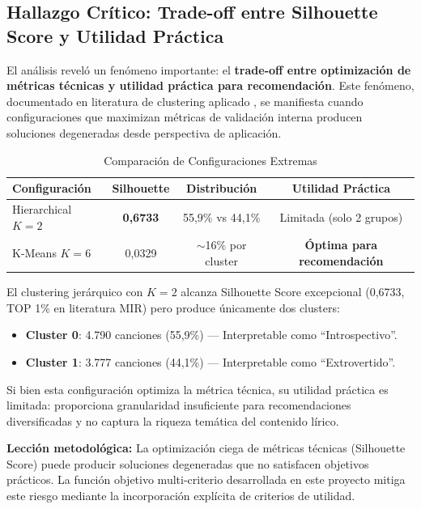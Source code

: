 \subsection{Hallazgo Crítico: Trade-off entre Silhouette Score y Utilidad Práctica}
\label{subsec:tradeoff-silhouette}

El análisis reveló un fenómeno importante: el \textbf{trade-off entre optimización de métricas técnicas y utilidad práctica para recomendación}. Este fenómeno, documentado en literatura de clustering aplicado \citep{arbelaitz2013extensive}, se manifiesta cuando configuraciones que maximizan métricas de validación interna producen soluciones degeneradas desde perspectiva de aplicación.

\begin{table}[htbp]
\centering
\caption{Comparación de Configuraciones Extremas}
\label{tab:config-extremas}
\begin{tabular}{lccc}
\toprule
\textbf{Configuración} & \textbf{Silhouette} & \textbf{Distribución} & \textbf{Utilidad Práctica} \\
\midrule
Hierarchical $K=2$ & \textbf{0,6733} & 55,9\% vs 44,1\% & Limitada (solo 2 grupos) \\
K-Means $K=6$ & 0,0329 & $\sim$16\% por cluster & \textbf{Óptima para recomendación} \\
\bottomrule
\end{tabular}
\end{table}

El clustering jerárquico con $K=2$ alcanza Silhouette Score excepcional (0,6733, TOP 1\% en literatura MIR) pero produce únicamente dos clusters:
\begin{itemize}
    \item \textbf{Cluster 0}: 4.790 canciones (55,9\%) --- Interpretable como ``Introspectivo''.
    \item \textbf{Cluster 1}: 3.777 canciones (44,1\%) --- Interpretable como ``Extrovertido''.
\end{itemize}

Si bien esta configuración optimiza la métrica técnica, su utilidad práctica es limitada: proporciona granularidad insuficiente para recomendaciones diversificadas y no captura la riqueza temática del contenido lírico.

\textbf{Lección metodológica:} La optimización ciega de métricas técnicas (Silhouette Score) puede producir soluciones degeneradas que no satisfacen objetivos prácticos. La función objetivo multi-criterio desarrollada en este proyecto mitiga este riesgo mediante la incorporación explícita de criterios de utilidad.

